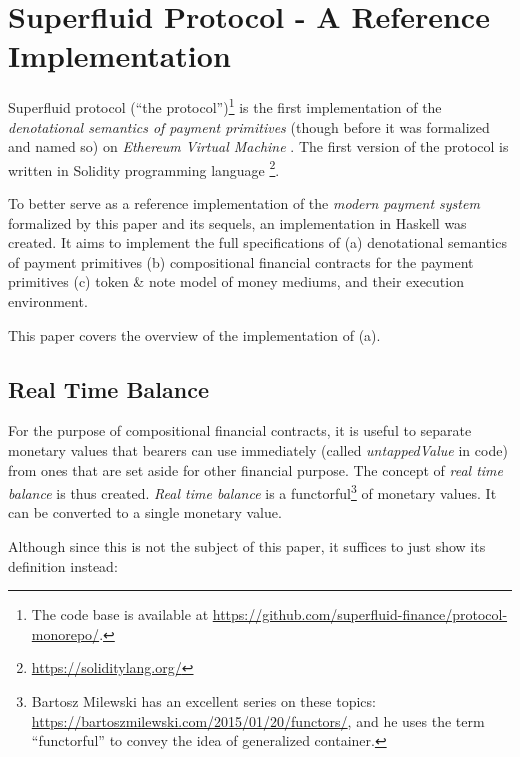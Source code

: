 \chapter{Superfluid Protocol - A Reference Implementation}

Superfluid protocol (``the protocol'')\footnote{The code base is available
at \url{https://github.com/superfluid-finance/protocol-monorepo/}.} is the first implementation of
the \textit{denotational semantics of payment primitives} (though before it was formalized and named
so) on \textit{Ethereum Virtual Machine} \cite{wood2014ethereum}. The first version of the protocol
is written in Solidity programming language \footnote{\url{https://soliditylang.org/}}.

To better serve as a reference implementation of the \textit{modern payment system} formalized by
this paper and its sequels, an implementation in Haskell was created. It aims to implement the full
specifications of (a) denotational semantics of payment primitives (b) compositional financial
contracts for the payment primitives (c) token \& note model of money mediums, and their execution
environment.

This paper covers the overview of the implementation of (a).

\section{Real Time Balance}

For the purpose of compositional financial contracts, it is useful to separate monetary values that
bearers can use immediately (called \textit{untappedValue} in code) from ones that are set aside for
other financial purpose. The concept of \textit{real time balance} is thus created. \textit{Real
time balance} is a functorful\footnote{Bartosz Milewski has an excellent series on these
topics: \url{https://bartoszmilewski.com/2015/01/20/functors/}, and he uses the term ``functorful''
to convey the idea of generalized container.} of monetary values. It can be converted to a single
monetary value.

Although since this is not the subject of this paper, it suffices to just show its definition
instead:

